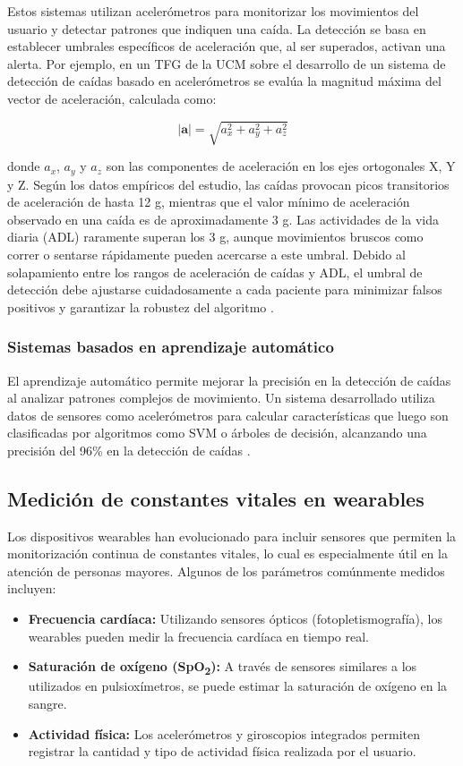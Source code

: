 \documentclass[12pt, a4paper]{article}
\begin{document}
	
	Estos sistemas utilizan acelerómetros para monitorizar los movimientos del usuario y detectar patrones que indiquen una caída. La detección se basa en establecer umbrales específicos de aceleración que, al ser superados, activan una alerta. Por ejemplo, en un TFG de la UCM sobre el desarrollo de un sistema de detección de caídas basado en acelerómetros se evalúa la magnitud máxima del vector de aceleración, calculada como:
	
	\[
	|\mathbf{a}| = \sqrt{a_x^2 + a_y^2 + a_z^2}
	\]
	
	donde \(a_x\), \(a_y\) y \(a_z\) son las componentes de aceleración en los ejes ortogonales X, Y y Z. Según los datos empíricos del estudio, las caídas provocan picos transitorios de aceleración de hasta 12 g, mientras que el valor mínimo de aceleración observado en una caída es de aproximadamente 3 g. Las actividades de la vida diaria (ADL) raramente superan los 3 g, aunque movimientos bruscos como correr o sentarse rápidamente pueden acercarse a este umbral. Debido al solapamiento entre los rangos de aceleración de caídas y ADL, el umbral de detección debe ajustarse cuidadosamente a cada paciente para minimizar falsos positivos y garantizar la robustez del algoritmo \cite{ucm2015}.
	
	\subsubsection{Sistemas basados en aprendizaje automático}
	
	El aprendizaje automático permite mejorar la precisión en la detección de caídas al analizar patrones complejos de movimiento. Un sistema desarrollado utiliza datos de sensores como acelerómetros para calcular características que luego son clasificadas por algoritmos como SVM o árboles de decisión, alcanzando una precisión del 96\% en la detección de caídas \cite{lauro2021}.
	
	
	\subsection{Medición de constantes vitales en wearables}
	
	Los dispositivos wearables han evolucionado para incluir sensores que permiten la monitorización continua de constantes vitales, lo cual es especialmente útil en la atención de personas mayores. Algunos de los parámetros comúnmente medidos incluyen:
	
	\begin{itemize}
		\item \textbf{Frecuencia cardíaca:} Utilizando sensores ópticos (fotopletismografía), los wearables pueden medir la frecuencia cardíaca en tiempo real.
		\item \textbf{Saturación de oxígeno (SpO\textsubscript{2}):} A través de sensores similares a los utilizados en pulsioxímetros, se puede estimar la saturación de oxígeno en la sangre.
		\item \textbf{Actividad física:} Los acelerómetros y giroscopios integrados permiten registrar la cantidad y tipo de actividad física realizada por el usuario.
	\end{itemize}
	
\end{document}
